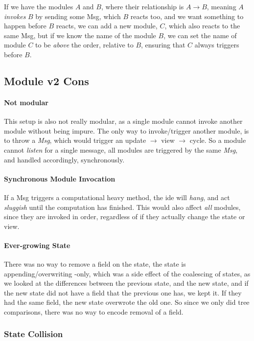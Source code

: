 If we have the modules $A$ and $B$, where their relationship is $A \to B$,
meaning $A$ \textit{invokes} $B$ by sending some Msg, which $B$ reacts too, and
we want something to happen before $B$ reacts, we can add a new module, $C$,
which also reacts to the same Msg, but if we know the name of the module $B$,
we can set the name of module $C$ to be \textit{above} the order, relative to
$B$, ensuring that $C$ always triggers before $B$.

\subsection{Module v2 Cons}

\paragraph{Not modular} This setup is also not really modular, as a single
module cannot invoke another module without being impure. The only way to
invoke/trigger another module, is to throw a \textit{Msg}, which would trigger
an update $\to$ view $\to$ cycle. So a module cannot \textit{listen} for a single
message, all modules are triggered by the same \textit{Msg}, and handled
accordingly, synchronously.

\paragraph{Synchronous Module Invocation} If a Msg triggers a computational
heavy method, the \gls*{ide} will \textit{hang}, and act \textit{sluggish} until
the computation has finished. This would also affect \textit{all} modules,
since they are invoked in order, regardless of if they actually change the
state or view.

\paragraph{Ever-growing State} There was no way to remove a field on the state,
the state is appending/overwriting -only, which was a side effect of the
coalescing of states, as we looked at the differences between the previous
state, and the new state, and if the new state did not have a field that the
previous one has, we kept it. If they had the same field, the new state
overwrote the old one. So since we only did tree comparisons, there was no way
to encode removal of a field.

\subsubsection{State Collision} \label{sec:collision}

